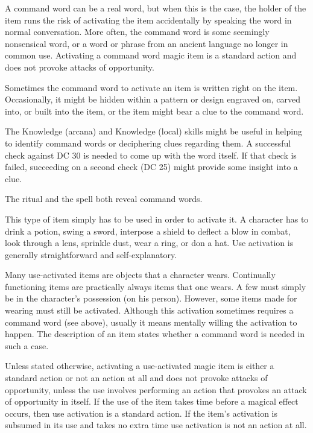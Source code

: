 A command word can be a real word, but when this is the case, the holder of the item runs the risk of activating the item accidentally by speaking the word in normal conversation. More often, the command word is some seemingly nonsensical word, or a word or phrase from an ancient language no longer in common use. Activating a command word magic item is a standard action and does not provoke attacks of opportunity.

Sometimes the command word to activate an item is written right on the item. Occasionally, it might be hidden within a pattern or design engraved on, carved into, or built into the item, or the item might bear a clue to the command word.

The Knowledge (arcana) and Knowledge (local) skills might be useful in helping to identify command words or deciphering clues regarding them. A successful check against DC 30 is needed to come up with the word itself. If that check is failed, succeeding on a second check (DC 25) might provide some insight into a clue.

The  ritual and the  spell both reveal command words.

 This type of item simply has to be used in order to activate it. A character has to drink a potion, swing a sword, interpose a shield to deflect a blow in combat, look through a lens, sprinkle dust, wear a ring, or don a hat. Use activation is generally straightforward and self-explanatory.

Many use-activated items are objects that a character wears. Continually functioning items are practically always items that one wears. A few must simply be in the character's possession (on his person). However, some items made for wearing must still be activated. Although this activation sometimes requires a command word (see above), usually it means mentally willing the activation to happen. The description of an item states whether a command word is needed in such a case.

Unless stated otherwise, activating a use-activated magic item is either a standard action or not an action at all and does not provoke attacks of opportunity, unless the use involves performing an action that provokes an attack of opportunity in itself. If the use of the item takes time before a magical effect occurs, then use activation is a standard action. If the item's activation is subsumed in its use and takes no extra time use activation is not an action at all.

